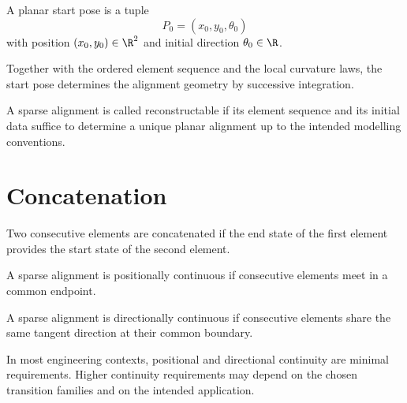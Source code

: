 \begin{definition}
A planar start pose is a tuple
\[
P_0=(x_0,y_0,\theta_0)
\]
with position $(x_0,y_0)\in\R^2$ and initial direction
$\theta_0\in\R$.
\end{definition}

\begin{remark}
Together with the ordered element sequence and the local curvature laws,
the start pose determines the alignment geometry by successive
integration.
\end{remark}

\begin{definition}
A sparse alignment is called reconstructable if its element sequence and
its initial data suffice to determine a unique planar alignment up to
the intended modelling conventions.
\end{definition}


\section{Concatenation}

\begin{definition}
Two consecutive elements are concatenated if the end state of the first
element provides the start state of the second element.
\end{definition}

\begin{definition}
A sparse alignment is positionally continuous if consecutive elements
meet in a common endpoint.
\end{definition}

\begin{definition}
A sparse alignment is directionally continuous if consecutive elements
share the same tangent direction at their common boundary.
\end{definition}

\begin{remark}
In most engineering contexts, positional and directional continuity are
minimal requirements. Higher continuity requirements may depend on the
chosen transition families and on the intended application.
\end{remark}

